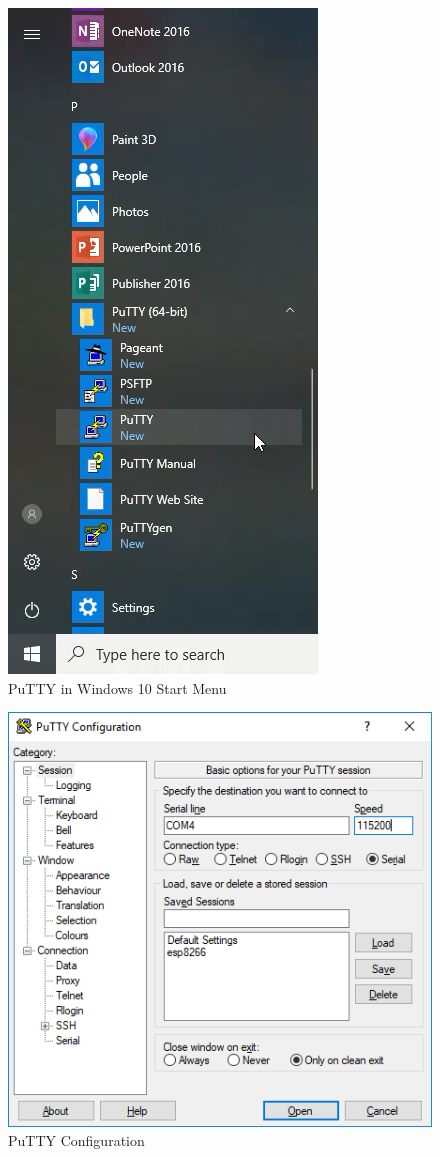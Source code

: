\documentclass{book}
\makeatletter
\def\maxwidth{\ifdim\Gin@nat@width>\linewidth\linewidth
    \else\Gin@nat@width\fi}
\let\Oldincludegraphics\includegraphics
\renewcommand{\includegraphics}[1]{\Oldincludegraphics[width=.8\maxwidth]{#1}}
\makeatother
\begin{document}
\begin{figure}
\centering
\includegraphics{images/putty_in_start_menu.png}
\caption{PuTTY in Windows 10 Start Menu}
\end{figure}

\begin{figure}
\centering
\includegraphics{images/putty_config.PNG}
\caption{PuTTY Configuration}
\end{figure}
\end{document}
